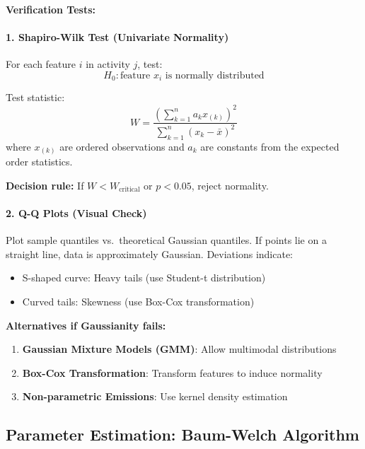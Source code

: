 \documentclass[11pt,a4paper]{article}
\begin{document}
\textbf{Verification Tests:}

\paragraph{1. Shapiro-Wilk Test (Univariate Normality)}

For each feature $i$ in activity $j$, test:
\begin{equation}
H_0: \text{feature } x_i \text{ is normally distributed}
\end{equation}

Test statistic:
\begin{equation}
W = \frac{\left(\sum_{k=1}^{n} a_k x_{(k)}\right)^2}{\sum_{k=1}^{n} (x_k - \bar{x})^2}
\end{equation}
where $x_{(k)}$ are ordered observations and $a_k$ are constants from the expected order statistics.

\textbf{Decision rule:} If $W < W_{\text{critical}}$ or $p < 0.05$, reject normality.

\paragraph{2. Q-Q Plots (Visual Check)}

Plot sample quantiles vs.\ theoretical Gaussian quantiles. If points lie on a straight line, data is approximately Gaussian. Deviations indicate:
\begin{itemize}[leftmargin=*]
    \item S-shaped curve: Heavy tails (use Student-t distribution)
    \item Curved tails: Skewness (use Box-Cox transformation)
\end{itemize}

\textbf{Alternatives if Gaussianity fails:}

\begin{enumerate}[leftmargin=*]
    \item \textbf{Gaussian Mixture Models (GMM)}: Allow multimodal distributions
    \item \textbf{Box-Cox Transformation}: Transform features to induce normality
    \item \textbf{Non-parametric Emissions}: Use kernel density estimation
\end{enumerate}

\subsection{Parameter Estimation: Baum-Welch Algorithm}
\end{document}
